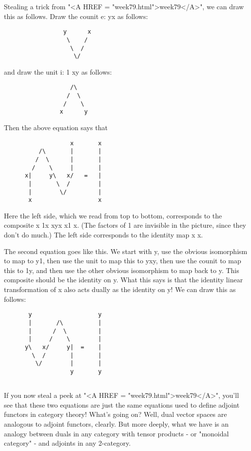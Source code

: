 Stealing a trick from "<A HREF = "week79.html">week79</A>", we can draw this as follows.  Draw the
counit e: yx  as follows:

\begin{verbatim}
                 y      x
                  \    /
                   \  / 
                    \/

\end{verbatim}
    
and draw the unit i: 1 \to  xy as follows:

\begin{verbatim}
                   /\
                  /  \
                 /    \
                x      y

\end{verbatim}
    
Then the above equation says that
                   
\begin{verbatim}
                   x       x
          /\       |       |
         /  \      |       |
        /    \     |       |
      x|     y\   x/   =   | 
       |       \  /        |
       |        \/         |
       x                   x

\end{verbatim}
    
Here the left side, which we read from top to bottom, corresponds to the
composite x \to  1x \to  xyx \to  x1 \to  x.  
(The factors of 1 are invisible in the
picture, since they don't do much.)  The left side corresponds to the
identity map x \to  x.  

The second equation goes like this.  We start with y, use the obvious
isomorphism to map to y1, then use the unit to map this to yxy, then use
the counit to map this to 1y, and then use the other obvious isomorphism
to map back to y.  This composite should be the identity on y.  What
this says is that the identity linear transformation of x also acts
dually as the identity on y!   We can draw this as follows:

\begin{verbatim}
       y                   y
       |       /\          |
       |      /  \         |
       |     /    \        |
      y\   x/     y|  =    | 
        \  /       |       |
         \/        |       |
                   y       y


\end{verbatim}
    
If you now steal a peek at "<A HREF = "week79.html">week79</A>", you'll see that these two equations
are just the same equations used to define adjoint functors in category
theory!  What's going on?  Well, dual vector spaces are analogous to
adjoint functors, clearly.  But more deeply, what we have is an analogy
between duals in any category with tensor products - or "monoidal
category" - and adjoints in any 2-category.

